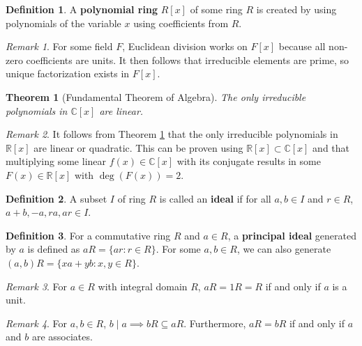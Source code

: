 \documentclass{article}
\newtheorem{theorem}{Theorem}[definition]
\theoremstyle{definition}
\newtheorem{definition}{Definition}[section]
\theoremstyle{remark}
\newtheorem{remark}{Remark}[definition]
\begin{document}
\begin{definition}
    A \textbf{polynomial ring} $R[x]$ of some ring $R$ is created by using
    polynomials of the variable $x$ using coefficients from $R$.
\end{definition}

\begin{remark}
    For some field $F$, Euclidean division works on $F[x]$ because all non-zero
    coefficients are units.
    It then follows that irreducible elements are prime, so unique factorization
    exists in $F[x]$.
\end{remark}

\begin{theorem}[Fundamental Theorem of Algebra]
    \label{thm:fundamental theorem of algebra}
    The only irreducible polynomials in $\mathbb{C}[x]$ are linear.
\end{theorem}

\begin{remark}
    It follows from Theorem \ref{thm:fundamental theorem of algebra} that the
    only irreducible polynomials in $\mathbb{R}[x]$ are linear or quadratic.
    This can be proven using $\mathbb{R}[x]\subset\mathbb{C}[x]$ and that
    multiplying some linear $f(x)\in\mathbb{C}[x]$ with its conjugate results
    in some $F(x)\in\mathbb{R}[x]$ with $\deg(F(x))=2$.
\end{remark}

\begin{definition}
    A subset $I$ of ring $R$ is called an \textbf{ideal} if for all
    $a,b\in I$ and $r\in R$, $a+b,-a,ra,ar\in I$.
\end{definition}

\begin{definition}
    For a commutative ring $R$ and $a\in R$, a \textbf{principal ideal}
    generated by $a$ is defined as $aR=\{ar:r\in R\}$.
    For some $a,b\in R$, we can also generate $(a,b)R=\{xa+yb:x,y\in R\}$.
\end{definition}

\begin{remark}
    For $a\in R$ with integral domain $R$, $aR=1R=R$ if and only if $a$ is a
    unit.
\end{remark}

\begin{remark}
    For $a,b\in R$, $b\mid a\implies bR\subseteq aR$.
    Furthermore, $aR=bR$ if and only if $a$ and $b$ are associates.
\end{remark}
\end{document}
